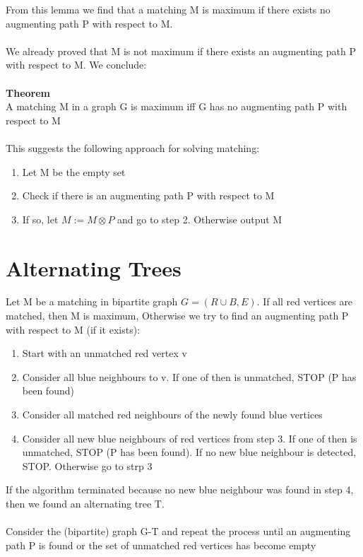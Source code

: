 \documentclass{article}[18pt]
\begin{document}
From this lemma we find that a matching M is maximum if there exists no augmenting path P with respect to M.\\
\\
We already proved that M is not maximum if there exists an augmenting path P with respect to M. We conclude:\\
\\
\textbf{Theorem}\\
A matching M in a graph G is maximum iff G has no augmenting path P with respect to M\\
\\
This suggests the following approach for solving matching:
\begin{enumerate}
	\item Let M be the empty set
	\item Check if there is an augmenting path P with respect to M
	\item If so, let $M:= M\otimes P$ and go to step 2. Otherwise output M
\end{enumerate}
\section{Alternating Trees}
Let M be a matching in bipartite graph $G=(R\cup B, E)$. If all red vertices are matched, then M is maximum, Otherwise we try to find an augmenting path P with respect to M (if it exists):
\begin{enumerate}
	\item Start with an unmatched red vertex v
	\item Consider all blue neighbours to v. If one of then is unmatched, STOP (P has been found)
	\item Consider all matched red neighbours of the newly found blue vertices
	\item Consider all new blue neighbours of red vertices from step 3. If one of then is unmatched, STOP (P has been found). If no new blue neighbour is detected, STOP. Otherwise go to strp 3
\end{enumerate}
If the algorithm terminated because no new blue neighbour was found in step 4, then we found an alternating tree T.\\
\\
Consider the (bipartite) graph G-T and repeat the process until an augmenting path P is found or the set of unmatched red vertices has become empty
\end{document}
